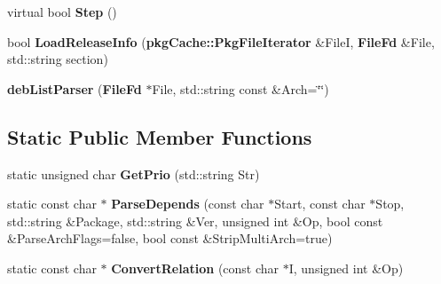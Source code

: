 \begin{DoxyCompactItemize}
\item 
virtual bool {\bfseries \-Step} ()\label{classdebListParser_a01c3fd4b023ba615710fdf31e11a7be1}

\item 
bool {\bfseries \-Load\-Release\-Info} ({\bf pkg\-Cache\-::\-Pkg\-File\-Iterator} \&\-File\-I, {\bf \-File\-Fd} \&\-File, std\-::string section)\label{classdebListParser_a045594301522e29d4764ab65e214b727}

\item 
{\bfseries deb\-List\-Parser} ({\bf \-File\-Fd} $\ast$\-File, std\-::string const \&\-Arch=\char`\"{}\char`\"{})\label{classdebListParser_ae5cc1f214108960c86c23a97b094e9d1}

\end{DoxyCompactItemize}
\subsection*{\-Static \-Public \-Member \-Functions}
\begin{DoxyCompactItemize}
\item 
static unsigned char {\bfseries \-Get\-Prio} (std\-::string \-Str)\label{classdebListParser_a0dad6b7b64cf47f4b2e3c37d91936d86}

\item 
static const char $\ast$ {\bfseries \-Parse\-Depends} (const char $\ast$\-Start, const char $\ast$\-Stop, std\-::string \&\-Package, std\-::string \&\-Ver, unsigned int \&\-Op, bool const \&\-Parse\-Arch\-Flags=false, bool const \&\-Strip\-Multi\-Arch=true)\label{classdebListParser_a1cafb6944a4188116e531eaf6b9af72b}

\item 
static const char $\ast$ {\bfseries \-Convert\-Relation} (const char $\ast$\-I, unsigned int \&\-Op)\label{classdebListParser_af750b129745fa9af327045eff83a89e9}

\end{DoxyCompactItemize}
